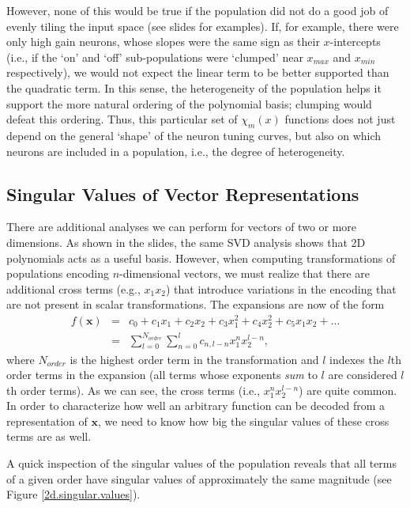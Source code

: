 \documentclass[10pt,letterpaper,oneside]{article}
\begin{document}
However, none of this would be true if the population did not do a
good job of evenly tiling the input space (see slides for examples). If, for example, there
were only high gain neurons, whose slopes were the same sign as their
$x$-intercepts (i.e., if the `on' and `off' sub-populations were
`clumped' near $x_{max}$ and $x_{min}$ respectively), we would not
expect the linear term to be better supported than the quadratic term.
In this sense, the heterogeneity of the population helps it support
the more natural ordering of the polynomial basis; clumping would
defeat this ordering. Thus, this particular set of $\chi_{m}(x)$
functions does not just depend on the general `shape' of the neuron
tuning curves, but also on which neurons are included in a population,
i.e., the degree of heterogeneity.

\subsection{Singular Values of Vector Representations}

There are additional analyses we can perform for vectors
of two or more dimensions. As shown in the slides, the same SVD analysis shows that 2D polynomials acts as a useful basis. However, when computing transformations of populations encoding $n$-dimensional
vectors, we must realize that there are additional cross terms (e.g.,
$x_{1}x_{2}$) that introduce variations in the encoding that are
not present in scalar transformations. The expansions are now of the
form
\begin{eqnarray*}
f(\mathbf{x}) & = & c_{0}+c_{1}x_{1}+c_{2}x_{2}+c_{3}x_{1}^{2}+c_{4}x_{2}^{2}+c_{5}x_{1}x_{2}+\ldots\\
 & = & \sum_{l=0}^{N_{order}}\sum_{n=0}^{l}c_{n,l-n}x_{1}^{n}x_{2}^{l-n},
\end{eqnarray*}
 where $N_{order}$ is the highest order term in the transformation
and $l$ indexes the $l$th order terms in the expansion (all terms
whose exponents \emph{sum} to $l$ are considered $l$th order terms).
As we can see, the cross terms (i.e., $x_{1}^{n}x_{2}^{l-n}$) are
quite common. In order to characterize how well an arbitrary function
can be decoded from a representation of $\mathbf{x}$, we need to
know how big the singular values of these cross terms are as well.

A quick inspection of the singular values of the population reveals
that all terms of a given order have singular values of approximately
the same magnitude (see Figure \ref{2d.singular.values}).
\end{document}

